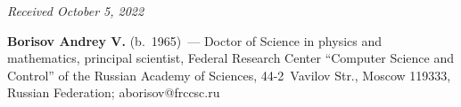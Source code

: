 \vspace*{-6pt}

\hfill{\small\textit{Received October 5, 2022}} 


\Contrl

\noindent
\textbf{Borisov Andrey V.} (b.\ 1965)~--- 
Doctor of Science in physics and mathematics, principal scientist, Federal Research Center ``Computer Science and Control''
 of the Russian Academy of Sciences, 44-2~Vavilov Str., Moscow 119333, Russian Federation; \mbox{aborisov@frccsc.ru}


 


\label{end\stat}

\renewcommand{\bibname}{\protect\rm Литература} 
    